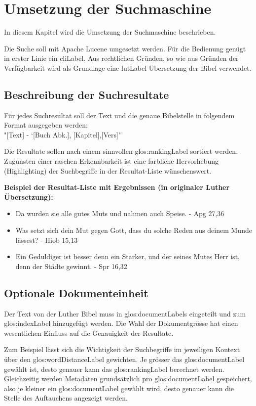 \chapter{Umsetzung der Suchmaschine}
In diesem Kapitel wird die Umsetzung der Suchmaschine beschrieben.

Die Suche soll mit Apache Lucene umgesetzt werden. Für die Bedienung genügt in erster Linie ein \gls{cliLabel}.
Aus rechtlichen Gründen, so wie aus Gründen der Verfügbarkeit wird als Grundlage eine \gls{lutLabel}-Übersetzung der Bibel verwendet.

\section{Beschreibung der Suchresultate}
Für jedes Suchresultat soll der Text und die genaue Bibelstelle in folgendem Format ausgegeben werden:\\
"[Text] - `[Buch Abk.], [Kapitel],[Vers]"'

Die Resultate sollen nach einem sinnvollen \gls{glos:rankingLabel} sortiert werden.
Zugunsten einer raschen Erkennbarkeit ist eine farbliche Hervorhebung (Highlighting) der Suchbegriffe in der Resultat-Liste wünschenswert.

\textbf{Beispiel der Resultat-Liste mit Ergebnissen (in originaler Luther Übersetzung):}
\begin{itemize}[noitemsep]
	\item Da wurden sie alle gutes Muts und nahmen auch Speise. - Apg 27,36
	\item Was setzt sich dein Mut gegen Gott, dass du solche Reden aus deinem Munde lässest? - Hiob 15,13
	\item Ein Geduldiger ist besser denn ein Starker, und der seines Mutes Herr ist, denn der Städte gewinnt. - Spr 16,32
\end{itemize}


\section{Optionale Dokumenteinheit}
Der Text von der Luther Bibel muss in \glspl{glos:documentLabel} eingeteilt und zum \gls{glos:indexLabel} hinzugefügt werden.
Die Wahl der Dokumentgrösse hat einen wesentlichen Einfluss auf die Genauigkeit der Resultate.

Zum Beispiel lässt sich die Wichtigkeit der Suchbegriffe im jeweiligen Kontext über den \gls{glos:wordDistanceLabel} gewichten.
Je grösser das \gls{glos:documentLabel} gewählt ist, desto genauer kann das \gls{glos:rankingLabel} berechnet werden.
Gleichzeitig werden Metadaten grundsätzlich pro \gls{glos:documentLabel} gespeichert, also je kleiner ein \gls{glos:documentLabel} gewählt wird, desto genauer kann die Stelle des Auftauchens angezeigt werden.

